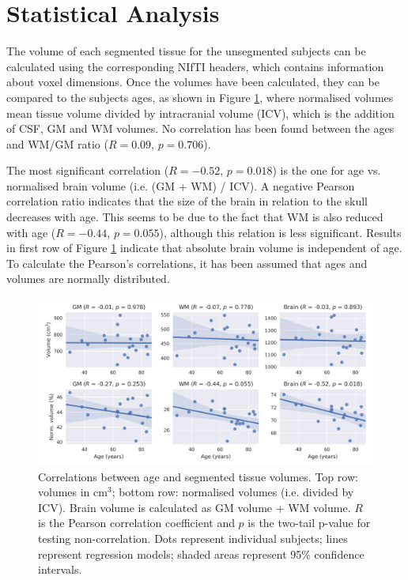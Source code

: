 \section{Statistical Analysis}



The volume of each segmented tissue for the unsegmented subjects can be calculated using the corresponding NIfTI headers, which contains information about voxel dimensions. Once the volumes have been calculated, they can be compared to the subjects ages, as shown in Figure \ref{fig:volumes-correlations}, where normalised volumes mean tissue volume divided by intracranial volume (ICV), which is the addition of CSF, GM and WM volumes. No correlation has been found between the ages and WM/GM ratio ($R = 0.09$, $p = 0.706$).

The most significant correlation ($R = -0.52$, $p = 0.018$) is the one for age vs. normalised brain volume (i.e. (GM + WM) / ICV). A negative Pearson correlation ratio indicates that the size of the brain in relation to the skull decreases with age. This seems to be due to the fact that WM is also reduced with age ($R = -0.44$, $p = 0.055$), although this relation is less significant. Results in first row of Figure \ref{fig:volumes-correlations} indicate that absolute brain volume is independent of age. To calculate the Pearson's correlations, it has been assumed that ages and volumes are normally distributed.

\begin{figure}
  \centering
  \includegraphics[width=\textwidth]{figures/volumes_stats}
  \caption{Correlations between age and segmented tissue volumes. Top row: volumes in cm$^3$; bottom row: normalised volumes (i.e. divided by ICV). Brain volume is calculated as GM volume + WM volume. $R$ is the Pearson correlation coefficient and $p$ is the two-tail p-value for testing non-correlation. Dots represent individual subjects; lines represent regression models; shaded areas represent 95\% confidence intervals.}
  \label{fig:volumes-correlations}
\end{figure}
